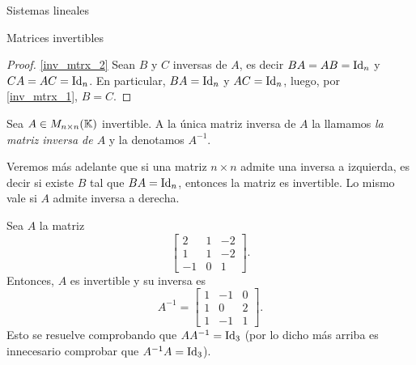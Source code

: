 \begin{chapter}{Sistemas lineales}
\begin{section}{Matrices invertibles}
\begin{proof}
                \ref{inv_mtrx_2} Sean $B$ y $C$ inversas de $A$, es decir $BA=AB=\operatorname{Id}_n$ y  $CA=AC=\operatorname{Id}_n$. En particular, $BA=\operatorname{Id}_n$ y $AC= \operatorname{Id}_n$, luego, por \ref{inv_mtrx_1}, $B=C$.  
            \end{proof}
            
            
            
            \begin{definicion}
                Sea $A\in M_{n\times n}(\mathbb K)$ invertible. A la única matriz inversa de $A$ la llamamos \textit{la matriz inversa de $A$} y la denotamos $A^{-1}$.
            \end{definicion}
            
            Veremos más adelante que si una matriz $n \times n$ admite una inversa a izquierda,  es decir si existe $B$ tal que $BA=\operatorname{Id}_n$, entonces la matriz es invertible. Lo mismo vale si $A$  admite inversa a derecha.
            
            \begin{ejemplo*}
                Sea $A$ la matriz 
                \begin{equation*}
                \begin{bmatrix} 2&1&-2\\ 1&1&-2\\ -1&0&1
                \end{bmatrix}.
                \end{equation*}
                Entonces,  $A$ es invertible y su inversa es
                \begin{equation*}
                A^{-1} = \begin{bmatrix} 1&-1&0\\ 1&0&2\\ 1&-1&1
                \end{bmatrix}.
                \end{equation*}
                Esto se resuelve comprobando que $AA^{-1}=\operatorname{Id}_3$ (por lo dicho más arriba es innecesario comprobar que $A^{-1}A=\operatorname{Id}_3$).
            \end{ejemplo*} 
            

\end{section}
\end{chapter}
